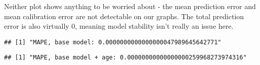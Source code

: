 \documentclass[
]{article}
\newenvironment{Shaded}{\begin{snugshade}}{\end{snugshade}}
\newcommand{\FunctionTok}[1]{\textcolor[rgb]{0.13,0.29,0.53}{\textbf{#1}}}
\newcommand{\NormalTok}[1]{#1}
\newcommand{\SpecialCharTok}[1]{\textcolor[rgb]{0.81,0.36,0.00}{\textbf{#1}}}
\newcommand{\StringTok}[1]{\textcolor[rgb]{0.31,0.60,0.02}{#1}}
\begin{document}
Neither plot shows anything to be worried about - the mean prediction
error and mean calibration error are not detectable on our graphs. The
total prediction error is also virtually 0, meaning model stability
isn't really an issue here.

\begin{Shaded}
\end{Shaded}

\begin{verbatim}
## [1] "MAPE, base model: 0.0000000000000000047989645642771"
\end{verbatim}

\begin{Shaded}
\end{Shaded}

\begin{verbatim}
## [1] "MAPE, base model + age: 0.00000000000000000259968273974316"
\end{verbatim}
\end{document}
